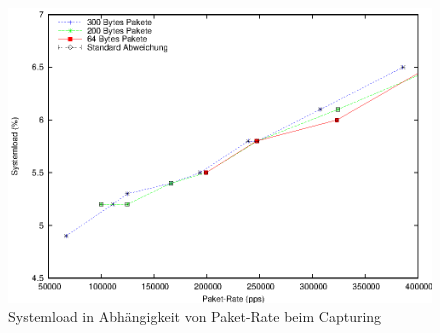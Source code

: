 \begin{figure} 
\centering \includegraphics[width=5.5in]{plots/graphs/sysload_single_CPU_pcie_pps}
\caption{Systemload in Abhängigkeit von Paket-Rate beim Capturing}
\label{img:plot_sysload_pps}
\end{figure}
%
